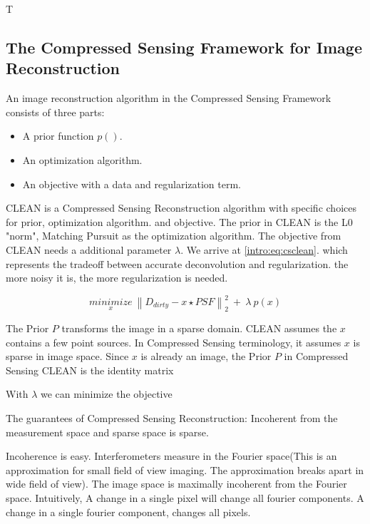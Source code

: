 T%


\subsection{The Compressed Sensing Framework for Image Reconstruction}
An image reconstruction algorithm in the Compressed Sensing Framework consists of three parts:

\begin{itemize}
	\item A prior function $p()$.
	\item An optimization algorithm.
	\item An objective with a data and regularization term.
\end{itemize}

CLEAN is a Compressed Sensing Reconstruction algorithm with specific choices for prior, optimization algorithm. and objective. The prior in CLEAN is the L0 "norm", Matching Pursuit as the optimization algorithm. The objective from CLEAN needs a additional parameter $\lambda$. We arrive at \eqref{intro:eq:csclean}. which represents the tradeoff between accurate deconvolution and regularization. the more noisy it is, the more regularization is needed.

\begin{equation}\label{intro:eq:csclean}
\underset{x}{minimize} \: \left \| D_{dirty} - x \star PSF \right \|_2^2 \: + \: \lambda \: p(x) 
\end{equation}

The Prior $P$ transforms the image in a sparse domain. CLEAN assumes the $x$ contains a few point sources. In Compressed Sensing terminology, it assumes $x$ is sparse in image space. Since $x$ is already an image, the Prior $P$ in Compressed Sensing CLEAN is the identity matrix

With $\lambda$ we can minimize the objective 

The guarantees of Compressed Sensing Reconstruction: Incoherent from the measurement space and sparse space is sparse.

Incoherence is easy. Interferometers measure in the Fourier space(This is an approximation for small field of view imaging. The approximation breaks apart in wide field of view). The image space is maximally incoherent from the Fourier space. Intuitively, A change in a single pixel will change all fourier components. A change in a single fourier component, changes all pixels.

